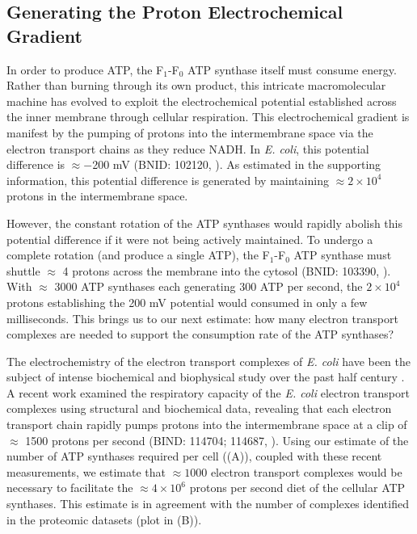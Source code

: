 \subsection{Generating the Proton Electrochemical Gradient}
In order to produce ATP, the F$_1$-F$_0$ ATP synthase itself must consume
energy. Rather than burning through its own product, this intricate
macromolecular machine has evolved to exploit the electrochemical potential
established across the inner membrane through cellular respiration. This
electrochemical gradient is manifest  by the pumping of protons into the
intermembrane space via the electron transport chains as they reduce NADH. In
\textit{E. coli}, this potential difference is $\approx -$200 mV (BNID: 102120,
\cite{milo2010}). As estimated in the supporting information, this potential
difference is generated by maintaining $\approx 2\times 10^4$ protons in the
intermembrane space.

However, the constant rotation of the ATP synthases would rapidly abolish
this potential difference if it were not being actively maintained. To
undergo a complete rotation (and produce a single ATP), the F$_1$-F$_0$ ATP
synthase must shuttle $\approx$ 4 protons across the membrane into the
cytosol (BNID: 103390, \cite{milo2010}). With $\approx$ 3000 ATP synthases each
generating 300 ATP per second, the $2 \times 10^4$ protons establishing the 200
mV potential would consumed in only a few milliseconds. This brings us
to our next estimate: how many electron transport complexes are needed to
support the consumption rate of the ATP synthases?

The electrochemistry of the electron transport complexes of \textit{E. coli}
have been the subject of intense biochemical and biophysical study over the past
half century \citep{ingledew1984, khademian2017,cox1970,henkel2014}. A recent
work \citep{szenk2017} examined the respiratory capacity of the \textit{E. coli}
electron transport complexes using structural and biochemical data, revealing
that each electron transport chain rapidly pumps protons into the intermembrane
space at a clip of $\approx$ 1500 protons per second (BIND: 114704; 114687,
\cite{milo2010}). Using our estimate of the number of ATP synthases required per
cell ((A)), coupled with these recent measurements, we
estimate that $\approx 1000$ electron transport complexes would be necessary to
facilitate the $\approx 4\times 10^6$ protons per second diet of the cellular
ATP synthases. This estimate is in agreement with the number of complexes
identified in the proteomic datasets (plot in (B)).


